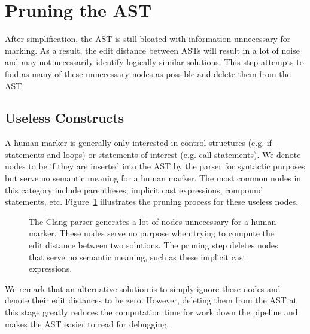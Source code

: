 \section{Pruning the AST}

After simplification, the AST is still bloated with information unnecessary for marking. As a result, the edit distance between ASTs will result in a lot of noise and may not necessarily identify logically similar solutions. This step attempts to find as many of these unnecessary nodes as possible and delete them from the AST.

\subsection{Useless Constructs}

A human marker is generally only interested in control structures (e.g. if-statements and loops) or statements of interest (e.g. call statements). We denote nodes to be  if they are inserted into the AST by the parser for syntactic purposes but serve no semantic meaning for a human marker. The most common nodes in this category include parentheses, implicit cast expressions, compound statements, etc. Figure~\ref{fig:cam-pruning-useless} illustrates the pruning process for these useless nodes.

\begin{figure}
\begin{minipage}{.45\textwidth}

\end{minipage}
\hfill
\begin{minipage}{.45\textwidth}

\end{minipage}
\caption[Pruning Useless Constructs]{The Clang parser generates a lot of nodes unnecessary for a human marker. These nodes serve no purpose when trying to compute the edit distance between two solutions. The pruning step deletes nodes that serve no semantic meaning, such as these implicit cast expressions.}
\label{fig:cam-pruning-useless}
\end{figure}

We remark that an alternative solution is to simply ignore these nodes and denote their edit distances to be zero. However, deleting them from the AST at this stage greatly reduces the computation time for work down the pipeline and makes the AST easier to read for debugging.


